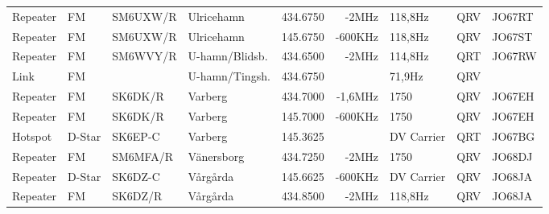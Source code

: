 \begin{landscape}
\begin{longtable}{llllrrlcl}
	Repeater          & FM           & SM6UXW/R      & Ulricehamn          &          434.6750 &          -2MHz & 118,8Hz         &       QRV       & JO67RT           \\
	Repeater          & FM           & SM6UXW/R      & Ulricehamn          &          145.6750 &        -600KHz & 118,8Hz         &       QRV       & JO67ST           \\
	Repeater          & FM           & SM6WVY/R      & U-hamn/Blidsb.      &          434.6500 &          -2MHz & 114,8Hz         &       QRT       & JO67RW           \\
	Link              & FM           &               & U-hamn/Tingsh.      &          434.6750 &                & 71,9Hz          &       QRV       &  \\
	Repeater          & FM           & SK6DK/R       & Varberg             &          434.7000 &        -1,6MHz & 1750            &       QRV       & JO67EH           \\
	Repeater          & FM           & SK6DK/R       & Varberg             &          145.7000 &        -600KHz & 1750            &       QRV       & JO67EH           \\
	Hotspot           & D-Star       & SK6EP-C       & Varberg             &          145.3625 &                & DV Carrier      &       QRT       & JO67BG           \\
	Repeater          & FM           & SM6MFA/R      & Vänersborg          &          434.7250 &          -2MHz & 1750            &       QRV       & JO68DJ           \\
	Repeater          & D-Star       & SK6DZ-C       & Vårgårda            &          145.6625 &        -600KHz & DV Carrier      &       QRV       & JO68JA           \\
	Repeater          & FM           & SK6DZ/R       & Vårgårda            &          434.8500 &          -2MHz & 118,8Hz         &       QRV       & JO68JA
\end{longtable}
\normalsize

\end{landscape}
